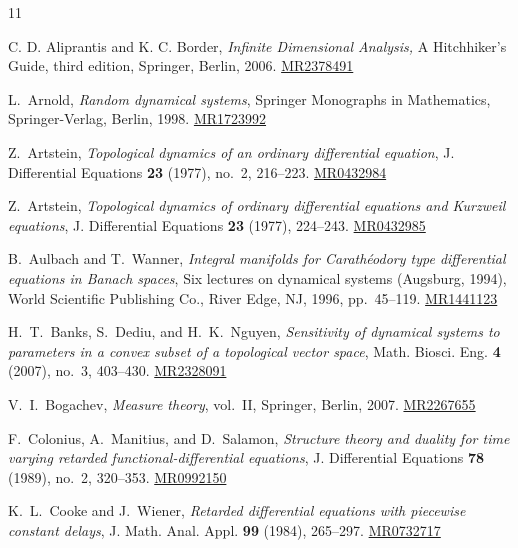 \documentclass[reqno]{amsart}
\theoremstyle{plain}
\numberwithin{equation}{section}
\numberwithin{definition}{section}
\begin{document}
\begin{thebibliography}{11}



C. D. Aliprantis and K. C. Border, \emph{Infinite Dimensional Analysis,} A Hitchhiker's Guide, third edition, Springer, Berlin, 2006. \href{https://mathscinet.ams.org/mathscinet-getitem?mr=2378491}{MR2378491}

L.~Arnold, \emph{Random dynamical systems},
Springer Monographs in Mathematics,
Springer-Verlag, Berlin, 1998.
\href{https://mathscinet.ams.org/mathscinet-getitem?mr=1723992}
{MR1723992} 

Z.~Artstein, \emph{Topological dynamics of an ordinary differential equation},
J. Differential Equations \textbf{23} (1977), no.~2, 216--223.
\href{https://mathscinet.ams.org/mathscinet-getitem?mr=432984}
{MR0432984}

Z.~Artstein, \emph{Topological dynamics of ordinary differential equations
and Kurzweil equations},
J. Differential Equations \textbf{23} (1977), 224--243. \href{https://mathscinet.ams.org/mathscinet-getitem?mr=432985}{MR0432985}

B.~Aulbach and T.~Wanner,
\emph{Integral manifolds for Carath\'eodory type differential equations
in Banach spaces},
Six lectures on dynamical systems (Augsburg, 1994),
World Scientific Publishing Co., River Edge, NJ, 1996, pp.~45--119. \href{https://mathscinet.ams.org/mathscinet-getitem?mr=1441123}{MR1441123}

H.~T.~Banks, S.~Dediu, and H.~K.~Nguyen,
\emph{Sensitivity of dynamical systems to parameters in a convex
subset of a topological vector space},
Math. Biosci. Eng. \textbf{4} (2007), no.~3, 403--430.
\href{https://mathscinet.ams.org/mathscinet-getitem?mr=2328091}
{MR2328091}

V.~I.~Bogachev, \emph{Measure theory}, vol.~II,
Springer, Berlin, 2007.
\href{https://mathscinet.ams.org/mathscinet-getitem?mr=2267655}
{MR2267655}

F.~Colonius, A.~Manitius, and D.~Salamon,
\emph{Structure theory and duality for time varying retarded
functional-differential equations},
J. Differential Equations \textbf{78} (1989), no.~2, 320--353.
\href{https://mathscinet.ams.org/mathscinet-getitem?mr=992150}
{MR0992150}

K.~L.~Cooke and J.~Wiener,
\emph{Retarded differential equations with piecewise constant delays},
J. Math. Anal. Appl. \textbf{99} (1984), 265--297.
\href{https://mathscinet.ams.org/mathscinet-getitem?mr=732717}
{MR0732717}



\end{thebibliography}
\end{document}
